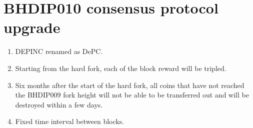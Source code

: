 \chapter{BHDIP010 consensus protocol upgrade}
\begin{flushleft}
   \begin{enumerate}
       \item DEPINC renamed as DePC.
       \item Starting from the hard fork, each of the block reward will be tripled.
       \item Six months after the start of the hard fork, all coins that have not reached the BHDIP009 fork height will not be able to be transferred out and will be destroyed within a few days.
       \item Fixed time interval between blocks.
   \end{enumerate}
\end{flushleft}
